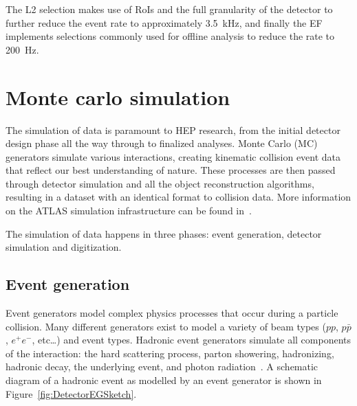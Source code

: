 The L2 selection makes use of RoIs and the full granularity of the detector to further reduce the event rate to approximately \SI{3.5}{\kHz}, and finally the EF implements selections commonly used for offline analysis to reduce the rate to \SI{200}{\Hz}.

\section{Monte carlo simulation} \label{DetectorMC}

The simulation of data is paramount to HEP research, from the initial detector design phase all the way through to finalized analyses. Monte Carlo (MC) generators simulate various interactions, creating kinematic collision event data that reflect our best understanding of nature. These processes are then passed through detector simulation and all the object reconstruction algorithms, resulting in a dataset with an identical format to collision data. More information on the ATLAS simulation infrastructure can be found in~\cite{Detector:ATLASSimulationInfra}.

The simulation of data happens in three phases: event generation, detector simulation and digitization. 

\subsection{Event generation} \label{DetectorEventGeneration}

Event generators model complex physics processes that occur during a particle collision. Many different generators exist to model a variety of beam types ($pp$, $p\bar{p}$, $e^+e^-$, etc\ldots) and event types. Hadronic event generators simulate all components of the interaction: the hard scattering process, parton showering, hadronizing, hadronic decay, the underlying event, and photon radiation~\cite{Les}. A schematic diagram of a hadronic event as modelled by an event generator is shown in Figure~\ref{fig:DetectorEGSketch}.

